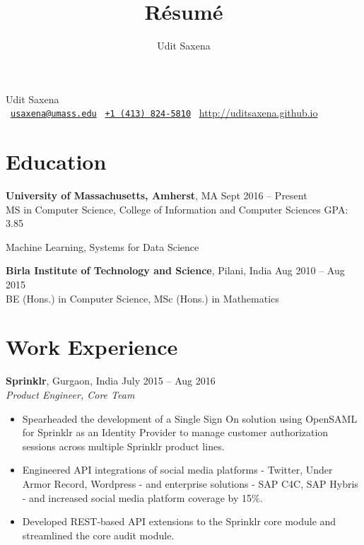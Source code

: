 \documentclass[letterpaper]{article}
\title{R\'esum\'e}
\author{Udit Saxena}
\begin{document}
\pagecolor{white}
\begin{center}
\huge
Udit Saxena\\
\small
\faEnvelope~\href{mailto:usaxena@umass.edu}{\nolinkurl{usaxena@umass.edu}}
\faPhone~\href{tel:14138245810}{\texttt{+1 (413) 824-5810}}
\faGlobe~\url{http://uditsaxena.github.io}
\normalsize
\end{center}

\section*{Education}
\vspace{-1mm}
\textbf{University of Massachusetts, Amherst}, MA \hfill Sept 2016 --
    Present\\
MS in Computer Science, College of Information and Computer Sciences \hfill GPA: 3.85
\vspace{-2mm}
\begin{description}[leftmargin=!, labelwidth=\widthof{Coursework },
        font=\normalfont]
    \item[Coursework:] Machine Learning,
                        Systems for Data Science
\end{description}
\vspace{-0.5mm}
\textbf{Birla Institute of Technology and Science}, Pilani, India \hfill
    Aug 2010 -- Aug 2015\\
BE (Hons.) in Computer Science,
MSc (Hons.) in Mathematics

\section*{Work Experience}
\textbf{Sprinklr}, Gurgaon, India \hfill July 2015 -- Aug 2016\\
\emph{Product Engineer, Core Team}\\
\vspace{-6mm}
\begin{itemize}
\item Spearheaded the development of a Single Sign On solution using OpenSAML for Sprinklr as an Identity Provider to manage customer authorization sessions across multiple Sprinklr product lines.
\vspace{-2mm}
\item Engineered API integrations of  social media platforms - Twitter, Under Armor Record, Wordpress - and enterprise solutions - SAP C4C, SAP Hybris - and increased social media platform coverage by 15\%. 
\vspace{-2mm}
\item Developed REST-based API extensions to the Sprinklr core module and streamlined the core audit module.
\end{itemize}
\end{document}
